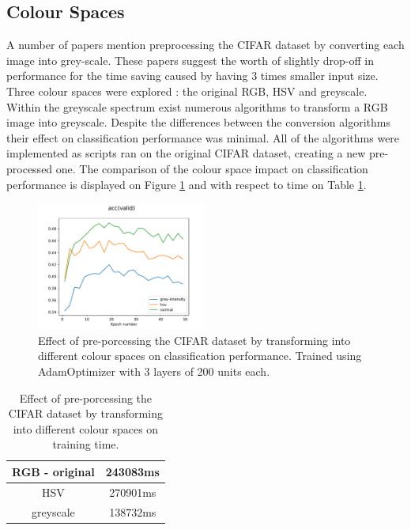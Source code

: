 \documentclass[12pt]{article}
\begin{document}
\subsection*{Colour Spaces}

A number of papers mention preprocessing the CIFAR dataset by converting each image into grey-scale\cite{grey1}\cite{grey2}. These papers suggest the worth of slightly drop-off in performance for the time saving caused by having 3 times smaller input size. Three colour spaces were explored : the original RGB, HSV and greyscale. Within the greyscale spectrum exist numerous algorithms to transform a RGB image into greyscale\cite{grey3}. Despite the differences between the conversion algorithms their effect on classification performance was minimal. All of the algorithms were implemented as scripts ran on the original CIFAR dataset, creating a new pre-processed one. The comparison of the colour space impact on classification performance is displayed on Figure \ref{fig:colour} and with respect to time on Table \ref{tab:colour}.

\begin{figure}[H]
\centering
\includegraphics[width=0.5\textwidth]{colour_comp.pdf}

  \caption{Effect of pre-porcessing the CIFAR dataset by transforming into different colour spaces on classification performance. Trained using AdamOptimizer with 3 layers of 200 units each.}
  \label{fig:colour}
\end{figure}

\begin{table}[H]
\centering
\begin{tabular}[h]{| c | c |}
\hline
RGB - original &   243083ms\\
\hline
HSV &   270901ms\\
\hline
greyscale &   138732ms \\
\hline
\end{tabular} 
\caption{Effect of pre-porcessing the CIFAR dataset by transforming into different colour spaces on training time.}
\label{tab:colour}
\end{table}
\end{document}
